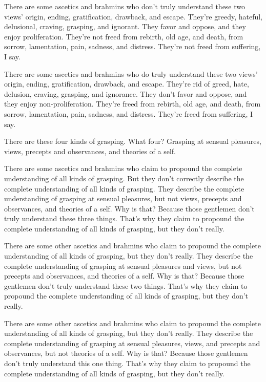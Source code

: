\documentclass[12pt,openany]{book}%
\begin{document}
There are some ascetics and brahmins who don’t truly understand these two views’ origin, ending, gratification, drawback, and escape. They’re greedy, hateful, delusional, craving, grasping, and ignorant. They favor and oppose, and they enjoy proliferation. They’re not freed from rebirth, old age, and death, from sorrow, lamentation, pain, sadness, and distress. They’re not freed from suffering, I say. 

There are some ascetics and brahmins who do truly understand these two views’ origin, ending, gratification, drawback, and escape. They’re rid of greed, hate, delusion, craving, grasping, and ignorance. They don’t favor and oppose, and they enjoy non-proliferation. They’re freed from rebirth, old age, and death, from sorrow, lamentation, pain, sadness, and distress. They’re freed from suffering, I say. 

There are these four kinds of grasping. What four? Grasping at sensual pleasures, views, precepts and observances, and theories of a self. 

There are some ascetics and brahmins who claim to propound the complete understanding of all kinds of grasping. But they don’t correctly describe the complete understanding of all kinds of grasping. They describe the complete understanding of grasping at sensual pleasures, but not views, precepts and observances, and theories of a self. Why is that? Because those gentlemen don’t truly understand these three things. That’s why they claim to propound the complete understanding of all kinds of grasping, but they don’t really. 

There are some other ascetics and brahmins who claim to propound the complete understanding of all kinds of grasping, but they don’t really. They describe the complete understanding of grasping at sensual pleasures and views, but not precepts and observances, and theories of a self. Why is that? Because those gentlemen don’t truly understand these two things. That’s why they claim to propound the complete understanding of all kinds of grasping, but they don’t really. 

There are some other ascetics and brahmins who claim to propound the complete understanding of all kinds of grasping, but they don’t really. They describe the complete understanding of grasping at sensual pleasures, views, and precepts and observances, but not theories of a self. Why is that? Because those gentlemen don’t truly understand this one thing. That’s why they claim to propound the complete understanding of all kinds of grasping, but they don’t really. 
\end{document}
